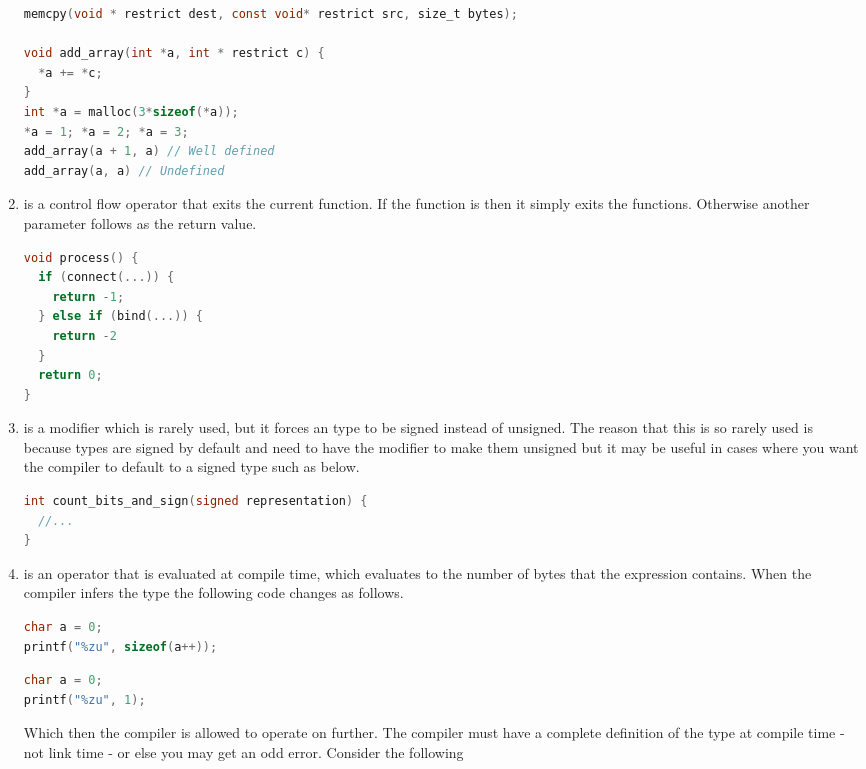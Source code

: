 \begin{enumerate}
	      \begin{lstlisting}[language=C]
memcpy(void * restrict dest, const void* restrict src, size_t bytes);

void add_array(int *a, int * restrict c) {
  *a += *c;
}
int *a = malloc(3*sizeof(*a));
*a = 1; *a = 2; *a = 3;
add_array(a + 1, a) // Well defined
add_array(a, a) // Undefined
\end{lstlisting}

	    \item {} is a control flow operator that exits the current function.
        If the function is  then it simply exits the functions.
        Otherwise another parameter follows as the return value.

	      \begin{lstlisting}[language=C]
void process() {
  if (connect(...)) {
    return -1;
  } else if (bind(...)) {
    return -2
  }
  return 0;
}
\end{lstlisting}

	    \item {} is a modifier which is rarely used, but it forces an type to be signed instead of unsigned.
        The reason that this is so rarely used is because types are signed by default and need to have the  modifier to make them unsigned but it may be useful in cases where you want the compiler to default to a signed type such as below.

	      \begin{lstlisting}[language=C]
int count_bits_and_sign(signed representation) {
  //...
}
\end{lstlisting}
	    \item {} is an operator that is evaluated at compile time, which evaluates to the number of bytes that the expression contains.
        When the compiler infers the type the following code changes as follows.
	      \begin{lstlisting}[language=C]
char a = 0;
printf("%zu", sizeof(a++));
\end{lstlisting}

	      \begin{lstlisting}[language=C]
char a = 0;
printf("%zu", 1);
\end{lstlisting}

	      Which then the compiler is allowed to operate on further.
        The compiler must have a complete definition of the type at compile time - not link time - or else you may get an odd error.
        Consider the following


\end{enumerate}
